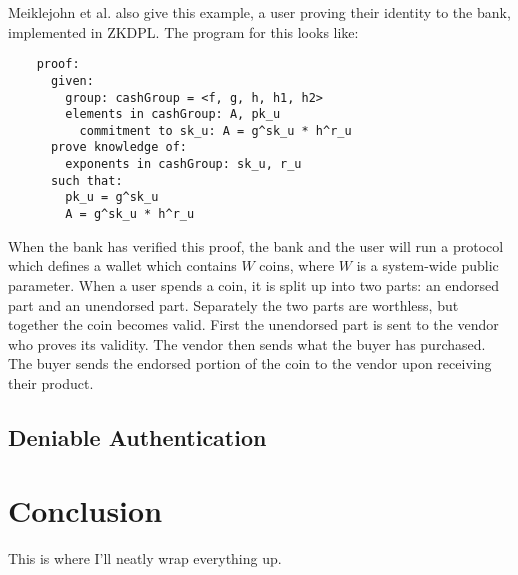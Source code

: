 \documentclass{sig-alternate}
\begin{document}
	Meiklejohn et al. also give this example, a user proving their identity to the bank,
	implemented in ZKDPL. The program for this looks like: 
	\begin{verbatim}
	proof:
	  given:
	  	group: cashGroup = <f, g, h, h1, h2>
	  	elements in cashGroup: A, pk_u
	  	  commitment to sk_u: A = g^sk_u * h^r_u
	  prove knowledge of:
	  	exponents in cashGroup: sk_u, r_u
	  such that:
	  	pk_u = g^sk_u
	  	A = g^sk_u * h^r_u
	\end{verbatim}
	
	When the bank has verified this proof, the bank and the user will run a protocol
	which defines a wallet which contains $W$ coins, where $W$ is a system-wide
	public parameter. When a user spends a coin, it is split up into two parts: an
	endorsed part and an unendorsed part. Separately the two parts are worthless, but
	together the coin becomes valid. First the unendorsed part is sent to the vendor
	who proves its validity. The vendor then sends what the buyer has purchased. The
	buyer sends the endorsed portion of the coin to the vendor upon receiving their
	product.
	
	\subsection{Deniable Authentication}

\section{Conclusion}
	This is where I'll neatly wrap everything up.




\end{document}
